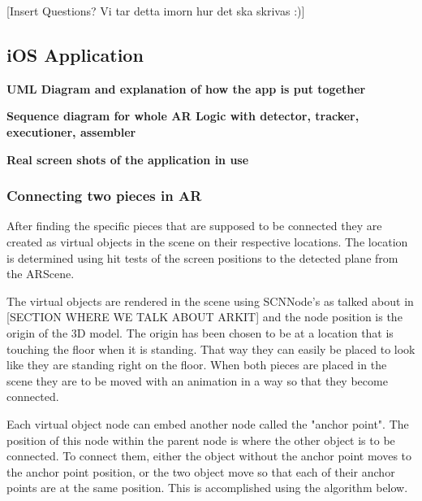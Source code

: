 [Insert Questions? Vi tar detta  imorn hur det ska skrivas :)]

\subsection{iOS Application}

\textbf{UML Diagram and explanation of how the app is put together}

\textbf{Sequence diagram for whole AR Logic with detector, tracker, executioner, assembler}

\textbf{Real screen shots of the application in use}



\subsubsection{Connecting two pieces in AR}
After finding the specific pieces that are supposed to be connected they are created as
virtual objects in the scene on their respective locations. The location is determined using
hit tests of the screen positions to the detected plane from the ARScene.

The virtual objects are rendered in the scene using SCNNode's as talked about in [SECTION WHERE WE TALK ABOUT ARKIT] and the node position is the origin of the 3D model. The origin has been chosen to be at a location that is touching the floor when it is standing. That way they can easily be placed to look like they are standing right on the floor.
When both pieces are placed in the scene they are to be moved with an animation in a way so that they become connected.

Each virtual object node can embed another node called the "anchor point". The position of this node within the parent node is where the other object is to be connected. To connect them, either the object without the anchor point moves to the anchor point position, or the two object move so that each of their anchor points are at the same position.
This is accomplished using the algorithm below.

